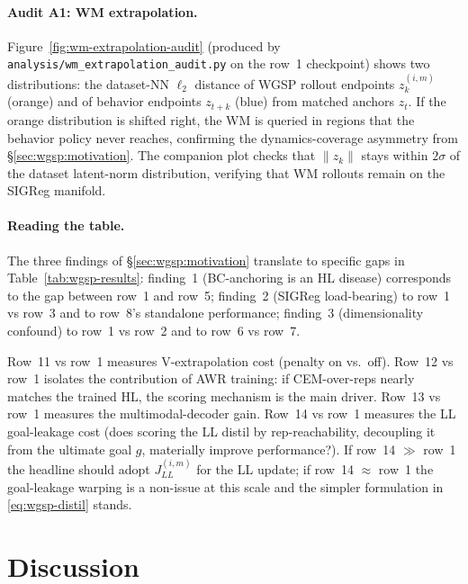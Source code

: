 \paragraph{Audit A1: WM extrapolation.}
Figure~\ref{fig:wm-extrapolation-audit} (produced by
\texttt{analysis/wm\_extrapolation\_audit.py} on the row~1 checkpoint)
shows two distributions: the dataset-NN $\ell_2$ distance of WGSP
rollout endpoints $z_k^{(i,m)}$ (orange) and of behavior endpoints
$z_{t+k}$ (blue) from matched anchors $z_t$. If the orange distribution
is shifted right, the WM is queried in regions that the behavior policy
never reaches, confirming the dynamics-coverage asymmetry from
\S\ref{sec:wgsp:motivation}. The companion plot checks that $\|z_k\|$
stays within $2\sigma$ of the dataset latent-norm distribution, verifying
that WM rollouts remain on the SIGReg manifold.

\paragraph{Reading the table.}
The three findings of \S\ref{sec:wgsp:motivation} translate to specific
gaps in Table~\ref{tab:wgsp-results}: finding~1 (BC-anchoring is an HL
disease) corresponds to the gap between row~1 and row~5; finding~2
(SIGReg load-bearing) to row~1 vs row~3 and to row~8's standalone
performance; finding~3 (dimensionality confound) to row~1 vs row~2 and
to row~6 vs row~7.

Row~11 vs row~1 measures V-extrapolation cost (penalty on vs.\ off).
Row~12 vs row~1 isolates the contribution of AWR training: if
CEM-over-reps nearly matches the trained HL, the scoring mechanism is
the main driver. Row~13 vs row~1 measures the multimodal-decoder gain.
Row~14 vs row~1 measures the LL goal-leakage cost (does scoring the LL
distil by rep-reachability, decoupling it from the ultimate goal $g$,
materially improve performance?). If row~14 $\gg$ row~1 the headline
should adopt $J_{LL}^{(i,m)}$ for the LL update; if row~14 $\approx$
row~1 the goal-leakage warping is a non-issue at this scale and the
simpler formulation in \eqref{eq:wgsp-distil} stands.

\section{Discussion}
\label{sec:wgsp:discussion}

